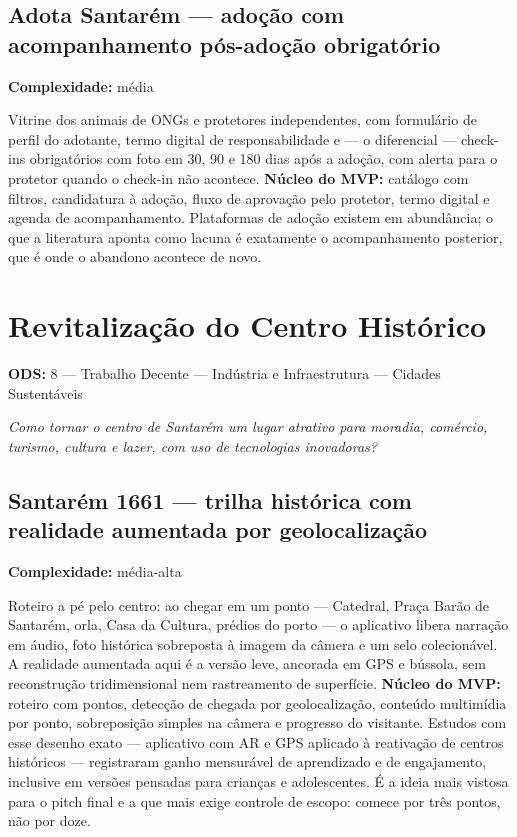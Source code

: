 \documentclass[11pt,a4paper]{article}
\newcommand{\complex}[1]{{\small\color{cinza}\textbf{Complexidade:} #1}}
\newcommand{\ods}[1]{{\small\color{verde}\textbf{ODS:} #1}}
\begin{document}
\subsection{Adota Santarém --- adoção com acompanhamento pós-adoção obrigatório}
\complex{média}

Vitrine dos animais de ONGs e protetores independentes, com formulário de perfil do adotante, termo
digital de responsabilidade e --- o diferencial --- check-ins obrigatórios com foto em 30, 90 e 180
dias após a adoção, com alerta para o protetor quando o check-in não acontece. \textbf{Núcleo do
MVP:} catálogo com filtros, candidatura à adoção, fluxo de aprovação pelo protetor, termo digital
e agenda de acompanhamento. Plataformas de adoção existem em abundância; o que a literatura aponta
como lacuna é exatamente o acompanhamento posterior, que é onde o abandono acontece de novo.

\newpage

\section{Revitalização do Centro Histórico}
\ods{8 --- Trabalho Decente  --- Indústria e Infraestrutura \quad 11 --- Cidades Sustentáveis}

\emph{Como tornar o centro de Santarém um lugar atrativo para moradia, comércio, turismo, cultura e
lazer, com uso de tecnologias inovadoras?}

\subsection{Santarém 1661 --- trilha histórica com realidade aumentada por geolocalização}
\complex{média-alta}

Roteiro a pé pelo centro: ao chegar em um ponto --- Catedral, Praça Barão de Santarém, orla, Casa da
Cultura, prédios do porto --- o aplicativo libera narração em áudio, foto histórica sobreposta à
imagem da câmera e um selo colecionável. A realidade aumentada aqui é a versão leve, ancorada em
GPS e bússola, sem reconstrução tridimensional nem rastreamento de superfície. \textbf{Núcleo do
MVP:} roteiro com pontos, detecção de chegada por geolocalização, conteúdo multimídia por ponto,
sobreposição simples na câmera e progresso do visitante. Estudos com esse desenho exato ---
aplicativo com AR e GPS aplicado à reativação de centros históricos --- registraram ganho mensurável
de aprendizado e de engajamento, inclusive em versões pensadas para crianças e adolescentes. É a
ideia mais vistosa para o pitch final e a que mais exige controle de escopo: comece por três pontos,
não por doze.
\end{document}
